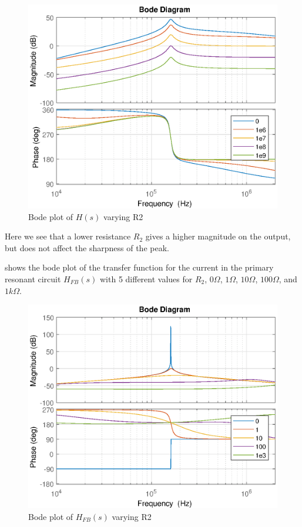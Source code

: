 \begin{figure}[H]
    \centering
    \includegraphics[width=\textwidth]{img/CoilRigBode_R2.eps}
    \caption{Bode plot of $H(s)$ varying R2}
    \label{fig:bode_r2}
\end{figure}

Here we see that a lower resistance $R_2$ gives a higher magnitude on the output, but does not affect the sharpness of the peak.

 shows the bode plot of the transfer function for the current in the primary resonant circuit $H_{FB}(s)$ with 5 different values for $R_2$, $0\Omega$, $1\Omega$, $10\Omega$, $100\Omega$, and $1k\Omega$.
\begin{figure}[H]
    \centering
    \includegraphics[width=\textwidth]{img/FeedBackBode_R2.eps}
    \caption{Bode plot of $H_{FB}(s)$ varying R2}
    \label{fig:fbbode_r2}
\end{figure}

